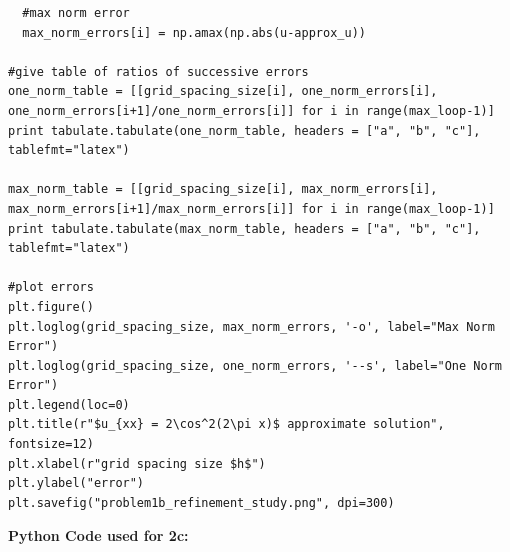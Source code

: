 \documentclass[12pt]{article}
\begin{document}
\begin{verbatim}
  #max norm error
  max_norm_errors[i] = np.amax(np.abs(u-approx_u))

#give table of ratios of successive errors
one_norm_table = [[grid_spacing_size[i], one_norm_errors[i], one_norm_errors[i+1]/one_norm_errors[i]] for i in range(max_loop-1)]
print tabulate.tabulate(one_norm_table, headers = ["a", "b", "c"], tablefmt="latex")

max_norm_table = [[grid_spacing_size[i], max_norm_errors[i], max_norm_errors[i+1]/max_norm_errors[i]] for i in range(max_loop-1)]
print tabulate.tabulate(max_norm_table, headers = ["a", "b", "c"], tablefmt="latex")

#plot errors
plt.figure()
plt.loglog(grid_spacing_size, max_norm_errors, '-o', label="Max Norm Error")
plt.loglog(grid_spacing_size, one_norm_errors, '--s', label="One Norm Error")
plt.legend(loc=0)
plt.title(r"$u_{xx} = 2\cos^2(2\pi x)$ approximate solution", fontsize=12)
plt.xlabel(r"grid spacing size $h$")
plt.ylabel("error")
plt.savefig("problem1b_refinement_study.png", dpi=300)
\end{verbatim}
\noindent \textbf{Python Code used for 2c:}
\end{document}
